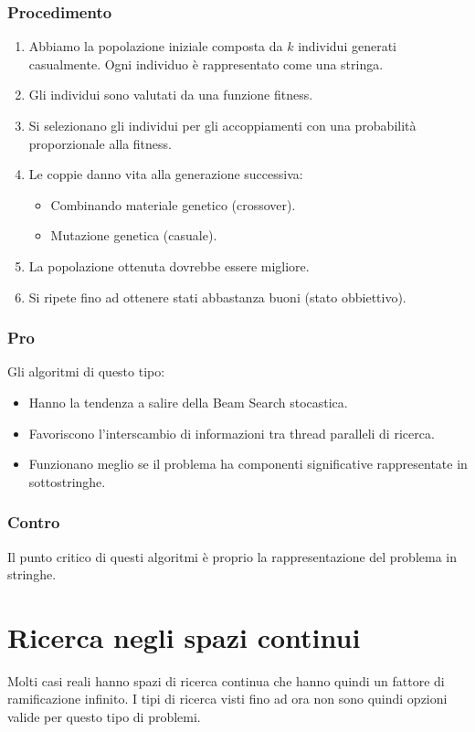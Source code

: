 \subsubsection{Procedimento}
\begin{enumerate}
	\item Abbiamo la popolazione iniziale composta da $k$ individui generati casualmente. Ogni individuo \`e rappresentato come una stringa.
	\item Gli individui sono valutati da una funzione fitness.
	\item Si selezionano gli individui per gli accoppiamenti con una probabilit\`a proporzionale alla fitness.
	\item Le coppie danno vita alla generazione successiva:
	      \begin{itemize}
		      \item Combinando materiale genetico (crossover).
		      \item Mutazione genetica (casuale).
	      \end{itemize}
	\item La popolazione ottenuta dovrebbe essere migliore.
	\item Si ripete fino ad ottenere stati abbastanza buoni (stato obbiettivo).
\end{enumerate}

\subsubsection{Pro}
Gli algoritmi di questo tipo:
\begin{itemize}
	\item Hanno la tendenza a salire della Beam Search stocastica.
	\item Favoriscono l'interscambio di informazioni tra thread paralleli di ricerca.
	\item Funzionano meglio se il problema ha componenti significative rappresentate in sottostringhe.
\end{itemize}

\subsubsection{Contro}
Il punto critico di questi algoritmi \`e proprio la rappresentazione del problema in stringhe.

\section{Ricerca negli spazi continui}
Molti casi reali hanno spazi di ricerca continua che hanno quindi un fattore di ramificazione infinito. I tipi di ricerca visti fino
ad ora non sono quindi opzioni valide per questo tipo di problemi.

